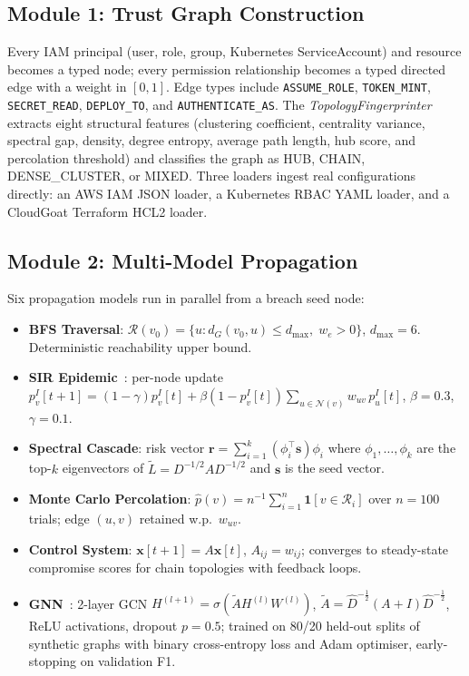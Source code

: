 \documentclass[conference,a4paper]{IEEEtran}
\begin{document}
\subsection{Module 1: Trust Graph Construction}

Every IAM principal (user, role, group, Kubernetes ServiceAccount) and
resource becomes a typed node; every permission relationship becomes a
typed directed edge with a weight in $[0,1]$.
Edge types include \texttt{ASSUME\_ROLE}, \texttt{TOKEN\_MINT},
\texttt{SECRET\_READ}, \texttt{DEPLOY\_TO}, and \texttt{AUTHENTICATE\_AS}.
The \textit{TopologyFingerprinter} extracts eight structural features
(clustering coefficient, centrality variance, spectral gap, density,
degree entropy, average path length, hub score, and percolation threshold)
and classifies the graph as HUB, CHAIN, DENSE\_CLUSTER, or MIXED.
Three loaders ingest real configurations directly: an AWS IAM JSON loader,
a Kubernetes RBAC YAML loader, and a CloudGoat Terraform HCL2 loader.

\subsection{Module 2: Multi-Model Propagation}

Six propagation models run in parallel from a breach seed node:

\begin{itemize}
  \item \textbf{BFS Traversal}:
        $\mathcal{R}(v_0)=\{u : d_G(v_0,u)\le d_{\max},\;w_e>0\}$,
        $d_{\max}{=}6$. Deterministic reachability upper bound.
  \item \textbf{SIR Epidemic}~\cite{kermack1927}: per-node update
        $p_v^I[t{+}1]=(1{-}\gamma)p_v^I[t]+\beta(1{-}p_v^I[t])
        \!\textstyle\sum_{u\in\mathcal{N}(v)}\!w_{uv}\,p_u^I[t]$,\;
        $\beta{=}0.3$, $\gamma{=}0.1$.
  \item \textbf{Spectral Cascade}: risk vector
        $\mathbf{r}=\!\sum_{i=1}^k(\phi_i^{\!\top}\mathbf{s})\phi_i$
        where $\phi_1,\ldots,\phi_k$ are the top-$k$ eigenvectors of
        $\tilde{L}=D^{-1/2}AD^{-1/2}$ and $\mathbf{s}$ is the seed vector.
  \item \textbf{Monte Carlo Percolation}:
        $\hat{p}(v)=n^{-1}\!\sum_{i=1}^n\mathbf{1}[v\!\in\!\mathcal{R}_i]$
        over $n{=}100$ trials; edge $(u,v)$ retained w.p.\ $w_{uv}$.
  \item \textbf{Control System}: $\mathbf{x}[t{+}1]=A\mathbf{x}[t]$,
        $A_{ij}=w_{ij}$; converges to steady-state compromise scores
        for chain topologies with feedback loops.
  \item \textbf{GNN}~\cite{kipf2017}: 2-layer GCN
        $H^{(l+1)}\!=\!\sigma\!\left(\tilde{A}H^{(l)}W^{(l)}\right)$,\;
        $\tilde{A}=\hat{D}^{-\frac{1}{2}}(A{+}I)\hat{D}^{-\frac{1}{2}}$,
        ReLU activations, dropout $p{=}0.5$;
        trained on 80/20 held-out splits of synthetic graphs with binary
        cross-entropy loss and Adam optimiser, early-stopping on
        validation F1.
\end{itemize}
\end{document}
